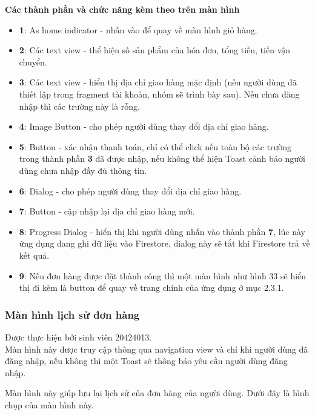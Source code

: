 \documentclass[12pt]{article}
\begin{document}
\newpage
\indent \textbf{Các thành phần và chức năng kèm theo trên màn hình}
\begin{itemize}
    \item \textbf{1}: As home indicator - nhấn vào để quay về màn hình giỏ hàng.
    \item \textbf{2}: Các text view - thể hiện số sản phẩm của hóa đơn, tổng tiền, tiền vận chuyển.
    \item \textbf{3}: Các text view - hiển thị địa chỉ giao hàng mặc định (nếu người dùng đã thiết lập trong fragment tài khoản, nhóm sẽ trình bày sau). Nếu chưa đăng nhập thì các trường này là rỗng.
    \item \textbf{4}: Image Button - cho phép người dùng thay đổi địa chỉ giao hàng.
    \item \textbf{5}: Button - xác nhận thanh toán, chỉ có thể click nếu toàn bộ các trường trong thành phần \textbf{3} đã được nhập, nếu không thể hiện Toast cảnh báo người dùng chưa nhập đầy đủ thông tin.
    \item \textbf{6}: Dialog - cho phép người dùng thay đổi địa chỉ giao hàng.
    \item \textbf{7}: Button - cập nhập lại địa chỉ giao hàng mới.
    \item \textbf{8}: Progress Dialog - hiển thị khi người dùng nhấn vào thành phần \textbf{7}, lúc này ứng dụng đang ghi dữ liệu vào Firestore, dialog này sẽ tắt khi Firestore trả về kết quả.
    \item \textbf{9}: Nếu đơn hàng được đặt thành công thì một màn hình như hình 33 sẽ hiển thị đi kèm là button để quay về trang chính của ứng dụng ở mục 2.3.1.
\end{itemize}

\subsubsection{Màn hình lịch sử đơn hàng}
Được thực hiện bởi sinh viên 20424013.\\

\indent Màn hình này được truy cập thông qua navigation view và chỉ khi người dùng đã đăng nhập, nếu không thì một Toast sẽ thông báo yêu cầu người dùng đăng nhập.

\indent Màn hình này giúp lưu lại lịch sử của đơn hàng của người dùng. Dưới đây là hình chụp của màn hình này.
\end{document}
